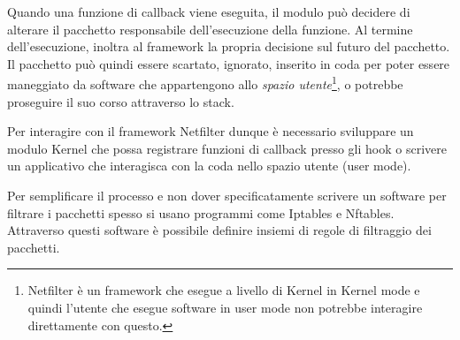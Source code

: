 Quando una funzione di callback viene eseguita, il modulo può decidere di alterare il pacchetto responsabile dell'esecuzione della funzione. Al termine dell'esecuzione, inoltra al framework la propria decisione sul futuro del pacchetto. Il pacchetto può quindi essere scartato, ignorato, inserito in coda per poter essere maneggiato da software che appartengono allo \textit{spazio utente}\footnote{Netfilter è un framework che esegue a livello di Kernel  in Kernel mode e quindi l'utente che esegue software in user mode non potrebbe interagire direttamente con questo.}, o potrebbe proseguire il suo corso attraverso lo stack.

Per interagire con il framework Netfilter dunque è necessario sviluppare un modulo Kernel che possa registrare funzioni di callback presso gli hook o scrivere un applicativo che interagisca con la coda nello spazio utente (user mode).

Per semplificare il processo e non dover specificatamente scrivere un software per  filtrare  i pacchetti spesso si usano programmi come Iptables e Nftables. Attraverso questi software è possibile definire insiemi di regole di filtraggio dei pacchetti.

